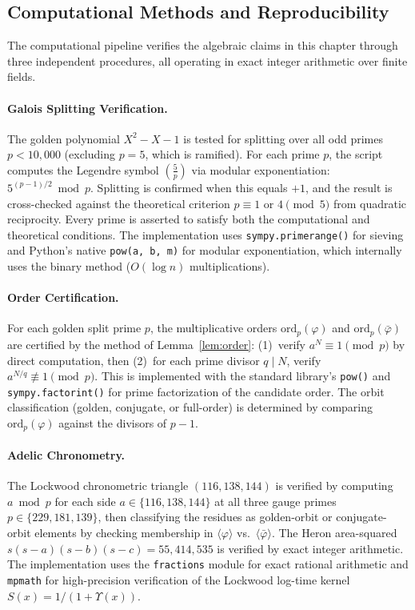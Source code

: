 \subsection{Computational Methods and Reproducibility}

The computational pipeline verifies the algebraic claims in this chapter through three independent procedures, all operating in exact integer arithmetic over finite fields.

\paragraph{Galois Splitting Verification.}
The golden polynomial $X^2 - X - 1$ is tested for splitting over all odd primes $p < 10{,}000$ (excluding $p = 5$, which is ramified). For each prime $p$, the script computes the Legendre symbol $\left(\frac{5}{p}\right)$ via modular exponentiation: $5^{(p-1)/2} \bmod p$. Splitting is confirmed when this equals $+1$, and the result is cross-checked against the theoretical criterion $p \equiv 1$ or $4 \pmod{5}$ from quadratic reciprocity. Every prime is asserted to satisfy both the computational and theoretical conditions. The implementation uses \texttt{sympy.primerange()} for sieving and Python's native \texttt{pow(a, b, m)} for modular exponentiation, which internally uses the binary method ($O(\log n)$ multiplications).

\paragraph{Order Certification.}
For each golden split prime $p$, the multiplicative orders $\mathrm{ord}_p(\varphi)$ and $\mathrm{ord}_p(\bar{\varphi})$ are certified by the method of Lemma~\ref{lem:order}: (1)~verify $a^N \equiv 1 \pmod{p}$ by direct computation, then (2)~for each prime divisor $q \mid N$, verify $a^{N/q} \not\equiv 1 \pmod{p}$. This is implemented with the standard library's \texttt{pow()} and \texttt{sympy.factorint()} for prime factorization of the candidate order. The orbit classification (golden, conjugate, or full-order) is determined by comparing $\mathrm{ord}_p(\varphi)$ against the divisors of $p - 1$.

\paragraph{Adelic Chronometry.}
The Lockwood chronometric triangle $(116, 138, 144)$ is verified by computing $a \bmod p$ for each side $a \in \{116, 138, 144\}$ at all three gauge primes $p \in \{229, 181, 139\}$, then classifying the residues as golden-orbit or conjugate-orbit elements by checking membership in $\langle \varphi \rangle$ vs.\ $\langle \bar{\varphi} \rangle$. The Heron area-squared $s(s-a)(s-b)(s-c) = 55{,}414{,}535$ is verified by exact integer arithmetic. The implementation uses the \texttt{fractions} module for exact rational arithmetic and \texttt{mpmath} for high-precision verification of the Lockwood log-time kernel $S(x) = 1/(1 + \Upsilon(x))$.

